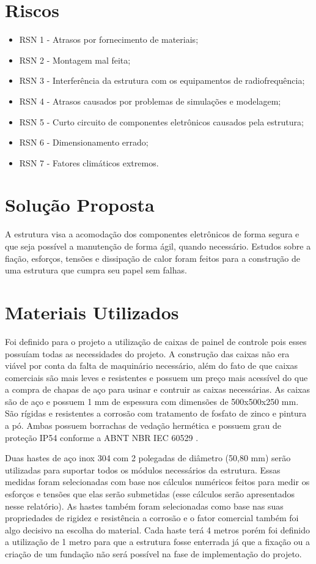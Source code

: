 \section{Riscos}

\begin{itemize}
\item RSN 1 - Atrasos por fornecimento de materiais;
\item RSN 2 - Montagem mal feita;
\item RSN 3 - Interferência da estrutura com os equipamentos de radiofrequência;
\item RSN 4 - Atrasos causados por problemas de simulações e modelagem;
\item RSN 5 - Curto circuito de componentes eletrônicos causados pela estrutura;
\item RSN 6 - Dimensionamento errado;
\item RSN 7 - Fatores climáticos extremos.
\end{itemize}

\section{Solução Proposta}

A estrutura visa a acomodação dos componentes eletrônicos de forma segura e que seja possível a manutenção de forma ágil, quando necessário. Estudos sobre a fiação, esforços, tensões e dissipação de calor foram feitos para a construção de uma estrutura que cumpra seu papel sem falhas.

\section{Materiais Utilizados}

Foi definido para o projeto a utilização de caixas de painel de controle pois esses possuíam todas as necessidades do projeto. A construção das caixas não era viável por conta da falta de maquinário necessário, além do fato de que caixas comerciais são mais leves e resistentes e possuem um preço mais acessível do que a compra de chapas de aço para usinar e contruir as caixas necessárias. As caixas são de aço e possuem 1 mm de espessura com dimensões de 500x500x250 mm. São rígidas e resistentes a corrosão com tratamento de fosfato de zinco e pintura a pó. Ambas possuem borrachas de vedação hermética e possuem grau de proteção IP54 conforme a ABNT NBR IEC 60529 \cite{material}. 

Duas hastes de aço inox 304 com 2 polegadas de diâmetro (50,80 mm) serão utilizadas para suportar todos os módulos necessários da estrutura. Essas medidas foram selecionadas com base nos cálculos numéricos feitos para medir os esforços e tensões que elas serão submetidas (esse cálculos serão apresentados nesse relatório). As hastes também foram selecionadas como base nas suas propriedades de rigidez e resistência a corrosão e o fator comercial também foi algo decisivo na escolha do material. Cada haste terá 4 metros porém foi definido a utilização de 1 metro para que a estrutura fosse enterrada já que a fixação ou a criação de um fundação não será possível na fase de implementação do projeto. 


